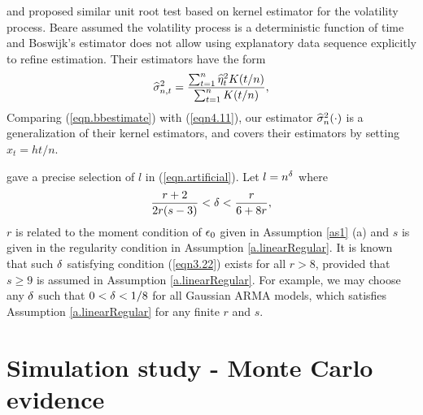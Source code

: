 \begin{rem}
\cite{beare2008} and \cite{boswijk2005} proposed similar unit root test based on kernel estimator for the volatility process. Beare assumed the volatility process is a deterministic function of time and Boswijk's estimator does not allow using explanatory data sequence explicitly to refine estimation. Their estimators have the form
\begin{equation}\la{eqn.bbestimate}
\widehat{\si}_{n,t}^2 = \frac{\sum_{t=1}^n \widehat{\eta}_{t}^2 K (t/n) }{\sum_{t=1}^n K(t/n)},
\end{equation}
Comparing (\ref{eqn.bbestimate}) with (\ref{eqn4.11}), our estimator $\widehat{\sigma}^2_n(\cdot)$ is a generalization of their kernel estimators, and  covers their estimators by setting $x_{t} =h t/n$.
\end{rem}


\begin{rem}
\cite{changparkphillips2001} gave a precise selection of $l$ in (\ref{eqn.artificial}). Let  $l = n^\delta$ where
\begin{equation}
\frac{r + 2}{2r (s - 3)} < \de < \frac{r}{6 + 8r}, \la{eqn3.22}
\end{equation}
$r$ is related to the moment condition of $\epsilon_0$ given in Assumption \ref{as1} (a) and $s$ is given in the regularity condition in Assumption \ref{a.linearRegular}. It is known that such $\delta$ satisfying condition (\ref{eqn3.22}) exists for all $r > 8$, provided that $s \ge 9$ is assumed in Assumption \ref{a.linearRegular}. For example, we may choose any $\delta$ such that $0 < \delta < 1/8$ for all Gaussian ARMA models, which satisfies Assumption \ref{a.linearRegular} for any finite $r$ and $s$.
\end{rem}



\section{Simulation study - Monte Carlo evidence} 


